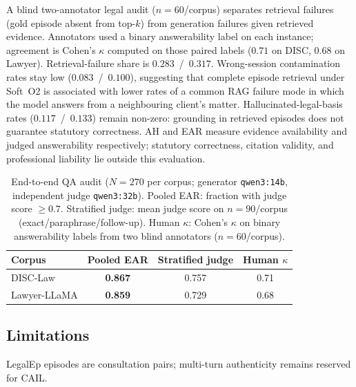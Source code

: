 \documentclass[preprint,12pt,authoryear]{elsarticle}
\newcommand{\compacttab}{\setlength{\tabcolsep}{4.5pt}\renewcommand{\arraystretch}{1.05}}
\begin{document}
A blind two-annotator legal audit ($n{=}60$/corpus) separates retrieval failures (gold episode absent from top-$k$) from generation failures given retrieved evidence.
Annotators used a binary answerability label on each instance; agreement is Cohen's $\kappa$ computed on those paired labels ($0.71$ on DISC, $0.68$ on Lawyer).
Retrieval-failure share is $0.283$~/~$0.317$.
Wrong-session contamination rates stay low ($0.083$~/~$0.100$), suggesting that complete episode retrieval under Soft~O2 is associated with lower rates of a common RAG failure mode in which the model answers from a neighbouring client's matter.
Hallucinated-legal-basis rates ($0.117$~/~$0.133$) remain non-zero: grounding in retrieved episodes does not guarantee statutory correctness.
AH and EAR measure evidence availability and judged answerability respectively; statutory correctness, citation validity, and professional liability lie outside this evaluation.

\begin{table}[htbp]
\centering
\caption{End-to-end QA audit ($N{=}270$ per corpus; generator \texttt{qwen3:14b}, independent judge \texttt{qwen3:32b}). Pooled EAR: fraction with judge score $\ge 0.7$. Stratified judge: mean judge score on $n{=}90$/corpus (exact/paraphrase/follow-up). Human $\kappa$: Cohen's $\kappa$ on binary answerability labels from two blind annotators ($n{=}60$/corpus).}
\label{tab:qa_audit}
\compacttab\footnotesize
\begin{tabular}{@{}lccc@{}}
\toprule
\textbf{Corpus} & \textbf{Pooled EAR} & \textbf{Stratified judge} & \textbf{Human $\kappa$} \\
\midrule
DISC-Law & \textbf{0.867} & 0.757 & 0.71 \\
Lawyer-LLaMA & \textbf{0.859} & 0.729 & 0.68 \\
\bottomrule
\end{tabular}
\end{table}

\subsection{Limitations}\label{sec:limitations}
LegalEp episodes are consultation pairs; multi-turn authenticity remains reserved for CAIL.
\end{document}

